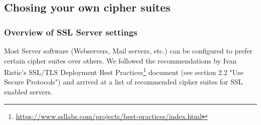 \subsection{Chosing your own cipher suites}
\label{section:ChosingYourOwnCipherSuites}

%

\subsubsection{Overview of SSL Server settings}


Most Server software (Webservers, Mail servers, etc.) can be configured to prefer certain cipher suites over others. 
We followed the recommendations by Ivan Ristic's SSL/TLS Deployment Best Practices\footnote{\url{https://www.ssllabs.com/projects/best-practices/index.html}} document (see section 2.2 "Use Secure Protocols") and arrived at a list of recommended cipher suites for SSL enabled servers.


